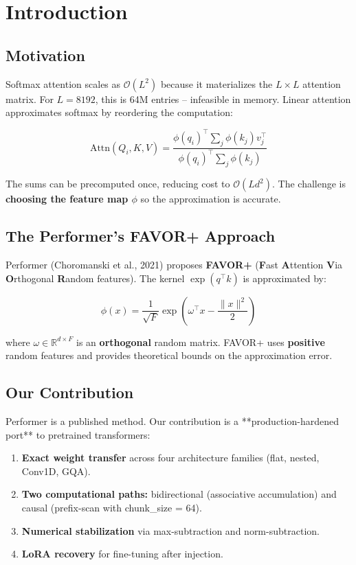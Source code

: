 
\section{Introduction}

\subsection{Motivation}

Softmax attention scales as $\mathcal{O}(L^2)$ because it materializes the 
$L \times L$ attention matrix. For $L = 8192$, this is 64M entries -- 
infeasible in memory. Linear attention approximates softmax by reordering 
the computation:

\[
\text{Attn}(Q_i, K, V) = \frac{\phi(q_i)^\top \sum_j \phi(k_j) v_j^\top}{\phi(q_i)^\top \sum_j \phi(k_j)}
\tag{1.1}
\]

The sums can be precomputed once, reducing cost to $\mathcal{O}(L d^2)$. The 
challenge is \textbf{choosing the feature map $\phi$} so the approximation is 
accurate.

\subsection{The Performer's FAVOR+ Approach}

Performer (Choromanski et al., 2021) proposes \textbf{FAVOR+} (\textbf{F}ast 
\textbf{A}ttention \textbf{V}ia \textbf{O}rthogonal \textbf{R}andom features). The kernel 
$\exp(q^\top k)$ is approximated by:

\[
\phi(x) = \frac{1}{\sqrt{F}} \exp\!\left(\omega^\top x - \frac{\|x\|^2}{2}\right)
\tag{1.2}
\]

where $\omega \in \mathbb{R}^{d \times F}$ is an \textbf{orthogonal} random 
matrix. FAVOR+ uses \textbf{positive} random features and provides theoretical 
bounds on the approximation error.

\subsection{Our Contribution}

Performer is a published method. Our contribution is a **production-hardened 
port** to pretrained transformers:

\begin{enumerate}
\item \textbf{Exact weight transfer} across four architecture families (flat,
  nested, Conv1D, GQA).
\item \textbf{Two computational paths:} bidirectional (associative accumulation)
  and causal (prefix-scan with chunk\_size = 64).
\item \textbf{Numerical stabilization} via max-subtraction and norm-subtraction.
\item \textbf{LoRA recovery} for fine-tuning after injection.

\end{enumerate}
